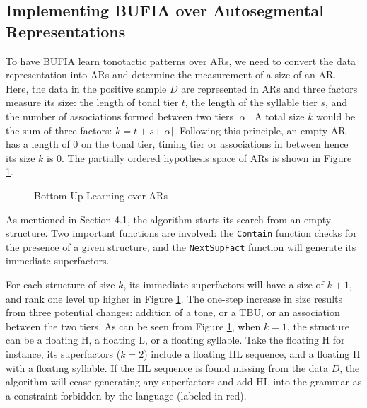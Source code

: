 \documentclass[11pt,letterpaper]{article}
\begin{document}
\subsection{Implementing BUFIA over Autosegmental Representations}
To have BUFIA learn tonotactic patterns over ARs, we need to convert the data representation into ARs and determine the measurement of a size of an AR. Here, the data in the positive sample \( D \) are represented in ARs and three factors measure its size: the length of tonal tier \(t\), the length of the syllable tier \(s\), and the number of associations formed between two tiers \(\vert \alpha\vert\). A total size \(k\) would be the sum of three factors: \(k = t+s+\vert\alpha\vert\). Following this principle, an empty AR has a length of 0 on the tonal tier, timing tier or associations in between hence its size \(k\) is 0. The partially ordered hypothesis space of ARs is shown in Figure \ref{fig:ARspace}.
\begin{figure}[ht]
	\centering
	
	\caption{Bottom-Up Learning over ARs}
	\label{fig:ARspace}
\end{figure}


As mentioned in Section 4.1, the algorithm starts its search from an empty structure. Two important functions are involved:  the \verb*|Contain| function checks for the presence of a given structure, and the \verb*|NextSupFact| function will generate its immediate superfactors. 

For each structure of size \(k\), its immediate superfactors will have a size of \(k+1\), and rank one level up higher in Figure \ref{fig:ARspace}. The one-step increase in size results from three potential changes: addition of a tone, or a TBU, or an association between the two tiers. As can be seen from Figure \ref{fig:ARspace}, when \(k=1\), the structure can be a floating H, a floating L, or a floating syllable. Take the floating H for instance, its superfactors (\(k=2\)) include a floating HL sequence, and a floating H with a floating syllable. If the HL sequence is found missing from the data \(D\), the algorithm will cease generating any superfactors and add HL into the grammar as a constraint forbidden by the language (labeled in red).

\end{document}
